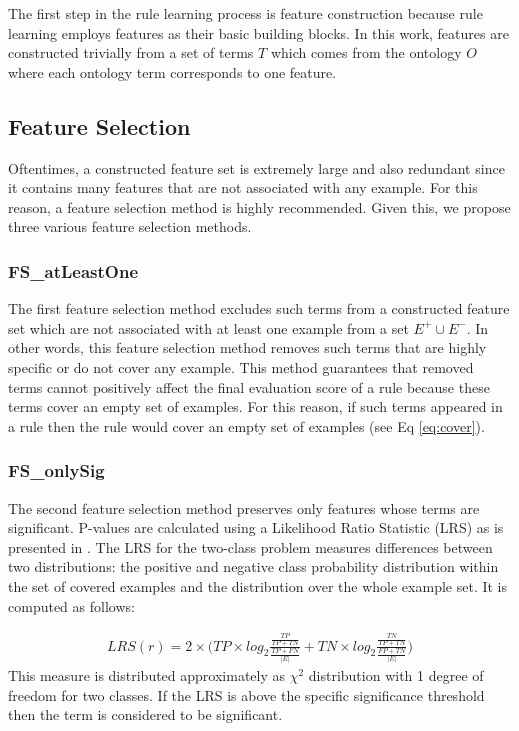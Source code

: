 \documentclass{bmcart}
\begin{document}
The first step in the rule learning process is feature construction because rule learning employs features as their basic building blocks. In this work, features are constructed trivially from a set of terms $T$ which comes from the ontology $O$ where each ontology term corresponds to one feature.


\subsection*{Feature Selection}\label{sec:feature_selection}
Oftentimes, a constructed feature set is extremely large and also redundant since it contains many features that are not associated with any example. For this reason, a feature selection method is highly recommended. Given this, we propose three various feature selection methods.

\subsubsection*{FS\_atLeastOne}
The first feature selection method excludes such terms from a constructed feature set which are not associated with at least one example from a set $E^{+} \cup E^{-}$. In other words, this feature selection method removes such terms that are highly specific or do not cover any example. This method guarantees that removed terms cannot positively affect the final evaluation score of a rule because these terms cover an empty set of examples. For this reason, if such terms appeared in a rule then the rule would cover an empty set of examples (see Eq \ref{eq:cover}).

\subsubsection*{FS\_onlySig}\label{ref:significance}
The second feature selection method preserves only features whose terms are significant. P-values are calculated using a Likelihood Ratio Statistic (LRS) as is presented in \cite{clark1989cn2}. The LRS for the two-class problem measures differences between two distributions: the positive and negative class probability distribution within the set of covered examples and the distribution over the whole example set. It is computed as follows:

\begin{eqnarray}
    LRS(r) = 2 \times \bigg( TP \times log_{2} \frac{\frac{TP}{TP+TN}}{\frac{TP+FN}{|E|}} + TN \times log_{2} \frac{\frac{TN}{TP+TN}}{\frac{FP+TN}{|E|}} \bigg)
\end{eqnarray}
This measure is distributed approximately as $\chi^{2}$ distribution with 1 degree of freedom for two classes. If the LRS is above the specific significance threshold then the term is considered to be significant.
\end{document}
